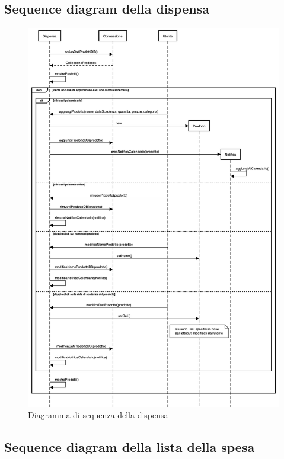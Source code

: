\subsection{Sequence diagram della dispensa}

\begin{figure}[H]
    \includegraphics[width=\linewidth]{images/sequence-pantry.png}
    \caption{Diagramma di sequenza della dispensa}
    \label{fig:seqpantry}
\end{figure}

\subsection{Sequence diagram della lista della spesa}

